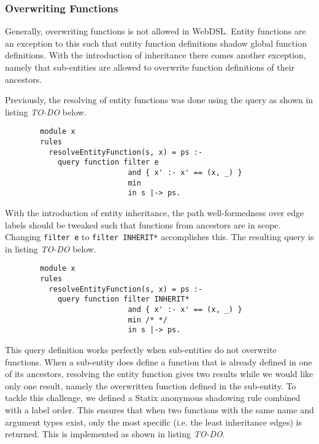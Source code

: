     \subsubsection{Overwriting Functions}
      Generally, overwriting functions is not allowed in WebDSL. Entity functions are an exception to this such that entity function definitions shadow global function definitions. With the introduction of inheritance there comes another exception, namely that sub-entities are allowed to overwrite function definitions of their ancestors.

      Previously, the resolving of entity functions was done using the query as shown in listing \emph{TO-DO} below.

      \begin{verbatim}
        module x
        rules
          resolveEntityFunction(s, x) = ps :-
            query function filter e
                            and { x' :- x' == (x, _) }
                            min
                            in s |-> ps.
      \end{verbatim}

      With the introduction of entity inheritance, the path well-formedness over edge labels should be tweaked such that functions from ancestors are in scope. Changing \texttt{filter e} to \texttt{filter INHERIT*} accomplishes this. The resulting query is in listing \emph{TO-DO} below.

      \begin{verbatim}
        module x
        rules
          resolveEntityFunction(s, x) = ps :-
            query function filter INHERIT*
                            and { x' :- x' == (x, _) }
                            min /* */
                            in s |-> ps.
      \end{verbatim}

      This query definition works perfectly when sub-entities do not overwrite functions. When a sub-entity does define a function that is already defined in one of its ancestors, resolving the entity function gives two results while we would like only one result, namely the overwritten function defined in the sub-entity. To tackle this challenge, we defined a Statix anonymous shadowing rule combined with a label order. This ensures that when two functions with the same name and argument types exist, only the most specific (i.e. the least inheritance edges) is returned. This is implemented as shown in listing \emph{TO-DO}.

